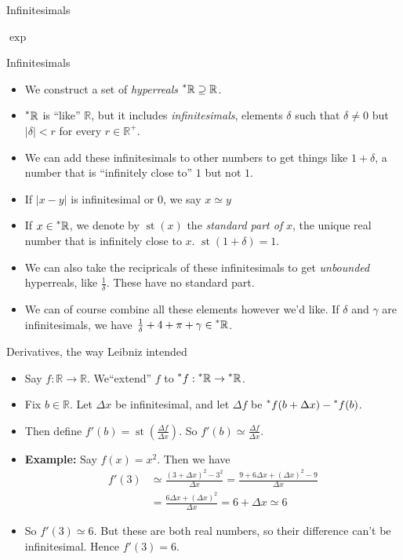 \documentclass{beamer}
\theoremstyle{plain}
\theoremstyle{definition}
\newcommand{\stp}[1]{\st\left(#1\right)}
\newcommand{\reals}{\mathbb{R}}
\newcommand{\hreals}{\prescript{*}{}{\mathbb{R}}}
\newcommand{\hr}[1]{\prescript{*}{}{#1}}
\DeclareMathOperator{\st}{st}
\begin{document}
\begin{frame}{Infinitesimals}

\end{frame}


\begin{frame}{$\exp$}
\end{frame}

\begin{frame}{Infinitesimals}
\begin{itemize}
	\item We construct a set of \textit{hyperreals} $\hreals \supseteq \reals$.
	\item $\hreals$ is ``like'' $\reals$, but it includes \textit{infinitesimals}, elements $\delta$ such that $\delta \neq 0$ but $|\delta| < r$ for every $r \in \reals^+$.
	\item We can add these infinitesimals to other numbers to get things like $1 + \delta$, a number that is ``infinitely close to'' $1$ but not $1$. 
	\item If $|x - y|$ is infinitesimal or $0$, we say $x \simeq y$
	\item If $x \in \hreals$, we denote by $\st(x)$ the \textit{standard part of} $x$, the unique real number that is infinitely close to $x$. $\st(1 + \delta) = 1$. 
	\item We can also take the recipricals of these infinitesimals to get \textit{unbounded} hyperreals, like $\frac{1}{\delta}$. These have no standard part.
	\item We can of course combine all these elements however we'd like. If $\delta$ and $\gamma$ are infinitesimals, we have $\frac{1}{\delta} + 4 + \pi + \gamma \in \hreals$.
\end{itemize}
\end{frame}

\begin{frame}{Derivatives, the way Leibniz intended}
\begin{itemize}
	\item Say $f: \reals \to \reals$. We``extend'' $f$ to $\hr{f}: \hreals \to \hreals$.
	\item Fix $b \in \reals$. Let $\Delta x$ be infinitesimal, and let $\Delta f$ be $\hr{f}(b + \Delta x) - \hr{f}(b)$.
	\item Then define $f'(b) = \stp{\frac{\Delta f}{\Delta x}}$. So $f'(b) \simeq \frac{\Delta f}{\Delta x}$.
	\item \textbf{Example:} Say $f(x) = x^2$. Then we have 
	\begin{align*}
	f'(3) &\simeq \frac{(3 + \Delta x)^2 - 3^2}{\Delta x} = \frac{9 + 6 \Delta x + (\Delta x)^2 - 9}{\Delta x} \\
		&= \frac{6 \Delta x + (\Delta x)^2}{\Delta x} = 6 + \Delta x \simeq 6
	\end{align*}
	\item So $f'(3) \simeq 6$. But these are both real numbers, so their difference can't be infinitesimal. Hence $f'(3) = 6$.
\end{itemize}
\end{frame}
\end{document}
